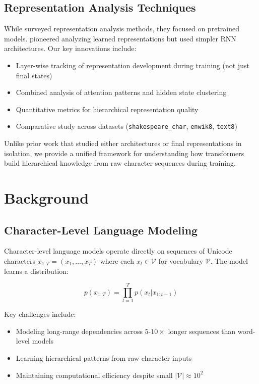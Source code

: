 \documentclass{article} %
\begin{document}
\subsection{Representation Analysis Techniques}
While \citep{Rogers2020API} surveyed representation analysis methods, they focused on pretrained models. \citep{bahdanau2014neural} pioneered analyzing learned representations but used simpler RNN architectures. Our key innovations include:
\begin{itemize}
    \item Layer-wise tracking of representation development during training (not just final states)
    \item Combined analysis of attention patterns and hidden state clustering
    \item Quantitative metrics for hierarchical representation quality
    \item Comparative study across datasets (\texttt{shakespeare\_char}, \texttt{enwik8}, \texttt{text8})
\end{itemize}

Unlike prior work that studied either architectures or final representations in isolation, we provide a unified framework for understanding how transformers build hierarchical knowledge from raw character sequences during training.

\section{Background}
\label{sec:background}

\subsection{Character-Level Language Modeling}
Character-level language models operate directly on sequences of Unicode characters $x_{1:T} = (x_1, \ldots, x_T)$ where each $x_t \in \mathcal{V}$ for vocabulary $\mathcal{V}$. The model learns a distribution:

\begin{equation}
    p(x_{1:T}) = \prod_{t=1}^T p(x_t|x_{1:t-1})
\end{equation}

Key challenges include:
\begin{itemize}
    \item Modeling long-range dependencies across $5$-$10\times$ longer sequences than word-level models
    \item Learning hierarchical patterns from raw character inputs
    \item Maintaining computational efficiency despite small $|\mathcal{V}| \approx 10^2$
\end{itemize}
\end{document}
